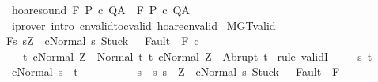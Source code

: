 \begin{isabellebody}
\isanewline
%
\endisadelimproof
\isanewline
{}\isamarkupfalse%
\ hoare{\isacharunderscore}sound{\isacharcolon}\ {\isachardoublequoteopen}{\isasymGamma}{\isacharcomma}{\isasymTheta}{\isasymturnstile}\isactrlbsub {\isacharslash}F\isactrlesub \ P\ c\ Q{\isacharcomma}A\ {\isasymLongrightarrow}\ {\isasymGamma}{\isacharcomma}{\isasymTheta}{\isasymTurnstile}\isactrlbsub {\isacharslash}F\isactrlesub \ P\ c\ Q{\isacharcomma}A{\isachardoublequoteclose}\isanewline
%
\isadelimproof
\ \ %
\endisadelimproof
%
\isatagproof
{}\isamarkupfalse%
\ {\isacharparenleft}iprover\ intro{\isacharcolon}\ cnvalid{\isacharunderscore}to{\isacharunderscore}cvalid\ hoare{\isacharunderscore}cnvalid{\isacharparenright}%
\endisatagproof
{\isafoldproof}%
%
\isadelimproof
%
\endisadelimproof
%
\isamarkuptrue%
\isamarkupfalse%
\ MGT{\isacharunderscore}valid{\isacharcolon}\isanewline
{\isachardoublequoteopen}{\isasymGamma}{\isasymTurnstile}\isactrlbsub {\isacharslash}F\isactrlesub {\isacharbraceleft}s{\isachardot}\ s{\isacharequal}Z\ {\isasymand}\ {\isasymGamma}{\isasymturnstile}{\isasymlangle}c{\isacharcomma}Normal\ s{\isasymrangle}\ {\isasymRightarrow}{\isasymnotin}{\isacharparenleft}{\isacharbraceleft}Stuck{\isacharbraceright}\ {\isasymunion}\ \ Fault\ {\isacharbackquote}\ {\isacharparenleft}{\isacharminus}F{\isacharparenright}{\isacharparenright}{\isacharbraceright}\ c\ \isanewline
\ \ \ {\isacharbraceleft}t{\isachardot}\ {\isasymGamma}{\isasymturnstile}{\isasymlangle}c{\isacharcomma}Normal\ Z{\isasymrangle}\ {\isasymRightarrow}\ Normal\ t{\isacharbraceright}{\isacharcomma}\ {\isacharbraceleft}t{\isachardot}\ {\isasymGamma}{\isasymturnstile}{\isasymlangle}c{\isacharcomma}Normal\ Z{\isasymrangle}\ {\isasymRightarrow}\ Abrupt\ t{\isacharbraceright}{\isachardoublequoteclose}\isanewline
%
\isadelimproof
%
\endisadelimproof
%
\isatagproof
{}\isamarkupfalse%
\ {\isacharparenleft}rule\ validI{\isacharparenright}\ \isanewline
\ \ \isamarkupfalse%
\ s\ t\isanewline
\ \ \isamarkupfalse%
\ {\isachardoublequoteopen}{\isasymGamma}{\isasymturnstile}{\isasymlangle}c{\isacharcomma}Normal\ s{\isasymrangle}\ {\isasymRightarrow}\ t{\isachardoublequoteclose}\ \isanewline
\ \ \ \ \ \ \ \ \ {\isachardoublequoteopen}s\ {\isasymin}\ {\isacharbraceleft}s{\isachardot}\ s\ {\isacharequal}\ Z\ {\isasymand}\ {\isasymGamma}{\isasymturnstile}{\isasymlangle}c{\isacharcomma}Normal\ s{\isasymrangle}\ {\isasymRightarrow}{\isasymnotin}{\isacharparenleft}{\isacharbraceleft}Stuck{\isacharbraceright}\ {\isasymunion}\ \ Fault\ {\isacharbackquote}\ {\isacharparenleft}{\isacharminus}F{\isacharparenright}{\isacharparenright}{\isacharbraceright}{\isachardoublequoteclose}\isanewline

\end{isabellebody}
